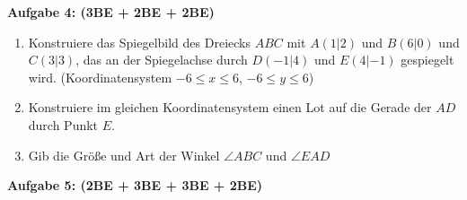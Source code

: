 \documentclass[a4paper,12pt]{article}
\newcommand{\Aufgabe}[1]{
  {
  \vspace*{0.5cm}
  \textsf{\textbf{Aufgabe #1}}
  \vspace*{0.2cm}
  
  }
}
\begin{document}
\newpage
\vspace*{-2cm}
\Aufgabe{4: (3BE + 2BE + 2BE)}
\begin{enumerate}[label={\alph*)}]
  \item Konstruiere das Spiegelbild des Dreiecks $ABC$ mit $A(1|2)$ und $B(6|0)$ und $C(3|3)$, das an der Spiegelachse durch $D(-1|4)$ und $E(4|-1)$ gespiegelt wird. (Koordinatensystem $-6\le x \le 6$, $-6\le y \le 6$)
  \item Konstruiere im gleichen Koordinatensystem einen Lot auf die Gerade der $AD$ durch Punkt $E$.
\vspace{190mm}
  \item Gib die Größe und Art der Winkel $\angle ABC$ und $\angle EAD$
\vspace{50mm}
\end{enumerate}

\newpage
\vspace*{-2cm}

\Aufgabe{5: (2BE + 3BE + 3BE + 2BE)}
\end{document}
